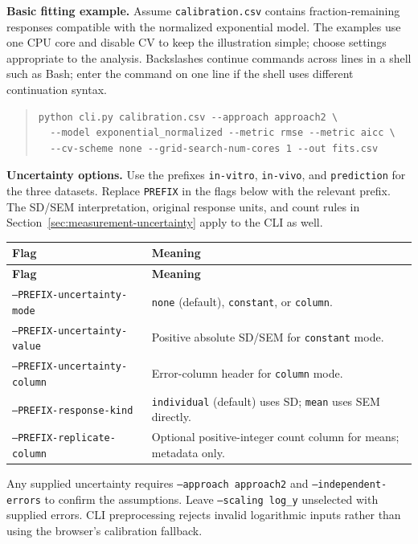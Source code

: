 \textbf{Basic fitting example.} Assume \texttt{calibration.csv} contains fraction-remaining responses compatible with the normalized exponential model. The examples use one CPU core and disable CV to keep the illustration simple; choose settings appropriate to the analysis. Backslashes continue commands across lines in a shell such as Bash; enter the command on one line if the shell uses different continuation syntax.

\begin{quote}
\small
\begin{verbatim}
python cli.py calibration.csv --approach approach2 \
  --model exponential_normalized --metric rmse --metric aicc \
  --cv-scheme none --grid-search-num-cores 1 --out fits.csv
\end{verbatim}
\end{quote}

\textbf{Uncertainty options.} Use the prefixes \texttt{in-vitro}, \texttt{in-vivo}, and \texttt{prediction} for the three datasets. Replace \texttt{PREFIX} in the flags below with the relevant prefix. The SD/SEM interpretation, original response units, and count rules in Section~\ref{sec:measurement-uncertainty} apply to the CLI as well.

\begin{longtable}{@{}>{\raggedright\arraybackslash}p{0.45\textwidth}>{\raggedright\arraybackslash}p{0.47\textwidth}@{}}
\toprule
\textbf{Flag} & \textbf{Meaning} \\
\midrule
\endfirsthead
\toprule
\textbf{Flag} & \textbf{Meaning} \\
\midrule
\endhead
\texttt{--PREFIX-uncertainty-mode} & \texttt{none} (default), \texttt{constant}, or \texttt{column}. \\
\texttt{--PREFIX-uncertainty-value} & Positive absolute SD/SEM for \texttt{constant} mode. \\
\texttt{--PREFIX-uncertainty-column} & Error-column header for \texttt{column} mode. \\
\texttt{--PREFIX-response-kind} & \texttt{individual} (default) uses SD; \texttt{mean} uses SEM directly. \\
\texttt{--PREFIX-replicate-column} & Optional positive-integer count column for means; metadata only. \\
\bottomrule
\end{longtable}

Any supplied uncertainty requires \texttt{--approach approach2} and \texttt{--independent-errors} to confirm the assumptions. Leave \texttt{--scaling log\_y} unselected with supplied errors. CLI preprocessing rejects invalid logarithmic inputs rather than using the browser's calibration fallback.

